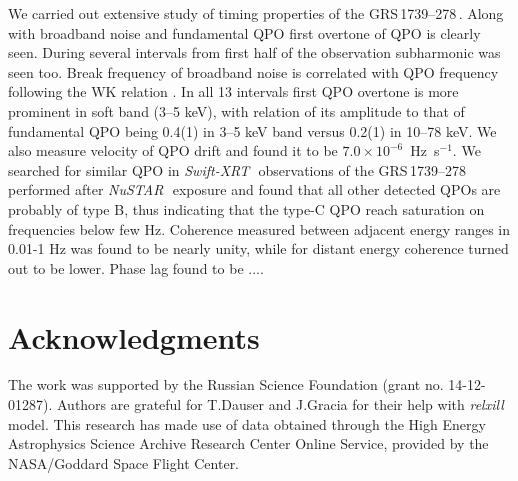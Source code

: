 \documentclass[a4paper,fleqn,usenatbib]{mnras}
\def\grs{{GRS\,1739--278\,}}
\def\swiftx{{\em Swift-XRT\,}}
\def\nustar{{\em NuSTAR\,}}
\begin{document}
We carried out extensive study of timing properties of the \grs. Along with broadband noise and fundamental QPO first overtone of QPO is clearly seen. During several intervals from first half of the observation subharmonic was seen too. Break frequency of broadband noise is correlated with QPO frequency following the WK relation \citep{wijnands99}. 
In all 13 intervals first QPO overtone is more prominent in soft band (3--5 keV), with relation of its amplitude to that of fundamental QPO being 0.4(1) in 3--5 keV band versus 0.2(1) in 10--78 keV.  We also measure velocity of QPO drift and found it to be $7.0\times10^{-6}$~Hz~s$^{-1}$. We searched for similar QPO in \swiftx\, observations of the \grs performed after \nustar\, exposure and found that all other detected QPOs are probably of type B, thus indicating that the type-C QPO reach saturation on frequencies below few Hz. 
Coherence measured between adjacent energy ranges in 0.01-1 Hz was found to be nearly unity, while for distant energy coherence turned out to be lower. Phase lag found to be ....


\section*{Acknowledgments}
The work was supported by the Russian Science Foundation (grant no. 14-12-01287). Authors are grateful for T.Dauser and J.Gracia for their help with {\em relxill} model. 
This research has made use of data obtained through the High Energy Astrophysics Science Archive Research Center Online Service, provided by the NASA/Goddard Space Flight Center.




\bsp	
\label{lastpage}
\end{document}
